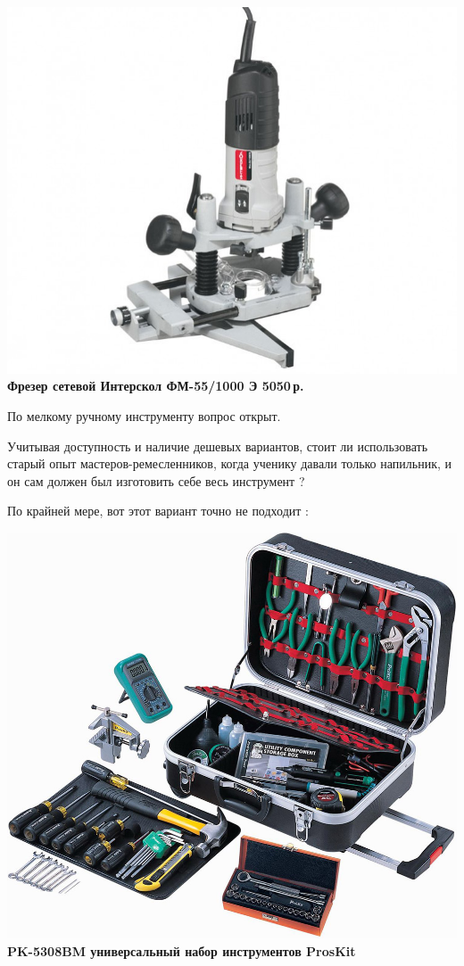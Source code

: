 \documentclass{magazine}
\begin{document}
\begin{multicols}{2}
\noindent\href{http://www.kuvalda.ru/catalog/1867/27920/}{
\includegraphics[width=\columnwidth]{fig/00/InterskolFM55.jpg}}
\textbf{Фрезер сетевой Интерскол ФМ-55/1000 Э 5050\,р.}

\bigskip
По мелкому ручному инструменту вопрос открыт.

Учитывая доступность и наличие дешевых вариантов, стоит ли использовать старый
опыт мастеров-ремесленников, когда ученику давали только напильник, и он сам
должен был изготовить себе весь инструмент ?

По крайней мере, вот этот вариант точно не подходит \smiley:

\noindent\includegraphics[width=\columnwidth]{fig/00/PK5308BM.jpg}
\textbf{PK-5308BM универсальный набор инструментов ProsKit}


\end{multicols}
\end{document}
